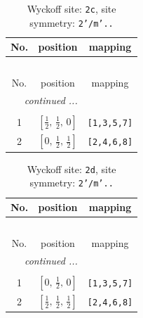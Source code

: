 \documentclass[fleqn,8pt]{jsarticle}
\begin{document}
\begin{longtable}{ccc}
\caption{Wyckoff site: {\tt 2c}, site symmetry: {\tt 2'/m'..}}
 \\
 \hline \hline
No. & position & mapping \\ \hline \endfirsthead

\multicolumn{2}{l}{\tablename\ \thetable{}} \\
 \hline \hline
No. & position & mapping \\ \hline \endhead

 \hline \hline
\multicolumn{2}{r}{\footnotesize\it continued ...} \\ \endfoot

 \hline \hline
\multicolumn{2}{r}{} \\ \endlastfoot

1 & $\left[ \frac{1}{2},\, \frac{1}{2},\, 0 \right]$ & {\tt [1,3,5,7]} \\ \hline
2 & $\left[ 0,\, \frac{1}{2},\, \frac{1}{2} \right]$ & {\tt [2,4,6,8]} \\
\end{longtable}
\renewcommand{\arraystretch}{1.2}
\begin{longtable}{ccc}
\caption{Wyckoff site: {\tt 2d}, site symmetry: {\tt 2'/m'..}}
 \\
 \hline \hline
No. & position & mapping \\ \hline \endfirsthead

\multicolumn{2}{l}{\tablename\ \thetable{}} \\
 \hline \hline
No. & position & mapping \\ \hline \endhead

 \hline \hline
\multicolumn{2}{r}{\footnotesize\it continued ...} \\ \endfoot

 \hline \hline
\multicolumn{2}{r}{} \\ \endlastfoot

1 & $\left[ 0,\, \frac{1}{2},\, 0 \right]$ & {\tt [1,3,5,7]} \\ \hline
2 & $\left[ \frac{1}{2},\, \frac{1}{2},\, \frac{1}{2} \right]$ & {\tt [2,4,6,8]} \\
\end{longtable}
\renewcommand{\arraystretch}{1.2}
\end{document}
